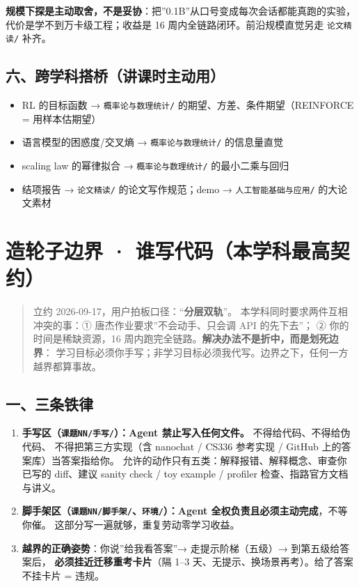 \documentclass[
  chinese,
  11pt,
]{ctexart}
\providecommand{\tightlist}{%
  \setlength{\itemsep}{0pt}\setlength{\parskip}{0pt}}
\begin{document}
\textbf{规模下探是主动取舍，不是妥协}：把''0.1B''从口号变成每次会话都能真跑的实验， 代价是学不到万卡级工程；收益是 16 周内全链路闭环。前沿规模直觉另走 \texttt{论文精读/} 补齐。

\subsection{六、跨学科搭桥（讲课时主动用）}\label{ux516dux8de8ux5b66ux79d1ux642dux6865ux8bb2ux8bfeux65f6ux4e3bux52a8ux7528}

\begin{itemize}
\tightlist
\item
  RL 的目标函数 → \texttt{概率论与数理统计/} 的期望、方差、条件期望（REINFORCE = 用样本估期望）
\item
  语言模型的困惑度/交叉熵 → \texttt{概率论与数理统计/} 的信息量直觉
\item
  scaling law 的幂律拟合 → \texttt{概率论与数理统计/} 的最小二乘与回归
\item
  结项报告 → \texttt{论文精读/} 的论文写作规范；demo → \texttt{人工智能基础与应用/} 的大论文素材
\end{itemize}

\newpage

\section{造轮子边界 · 谁写代码（本学科最高契约）}\label{ux9020ux8f6eux5b50ux8fb9ux754c-ux8c01ux5199ux4ee3ux7801ux672cux5b66ux79d1ux6700ux9ad8ux5951ux7ea6}

\begin{quote}
立约 2026-09-17，用户拍板口径：``\textbf{分层双轨}''。 本学科同时要求两件互相冲突的事：① 唐杰作业要求''不会动手、只会调 API 的先下去''； ② 你的时间是稀缺资源，16 周内跑完全链路。\textbf{解决办法不是折中，而是划死边界}： 学习目标必须你手写；非学习目标必须我代写。边界之下，任何一方越界都算事故。
\end{quote}

\subsection{一、三条铁律}\label{ux4e00ux4e09ux6761ux94c1ux5f8b}

\begin{enumerate}
\def\labelenumi{\arabic{enumi}.}
\tightlist
\item
  \textbf{手写区（\texttt{课题NN/手写/}）：Agent 禁止写入任何文件。} 不得给代码、不得给伪代码、 不得把第三方实现（含 nanochat / CS336 参考实现 / GitHub 上的答案库）当答案指给你。 允许的动作只有五类：解释报错、解释概念、审查你已写的 diff、建议 sanity check / toy example / profiler 检查、指路官方文档与讲义。
\item
  \textbf{脚手架区（\texttt{课题NN/脚手架/}、\texttt{环境/}）：Agent 全权负责且必须主动完成}，不等你催。 这部分写一遍就够，重复劳动零学习收益。
\item
  \textbf{越界的正确姿势}：你说''给我看答案''→ 走提示阶梯（五级）→ 到第五级给答案后， \textbf{必须挂近迁移重考卡片}（隔 1--3 天、无提示、换场景再考）。给了答案不挂卡片 = 违规。
\end{enumerate}
\end{document}
